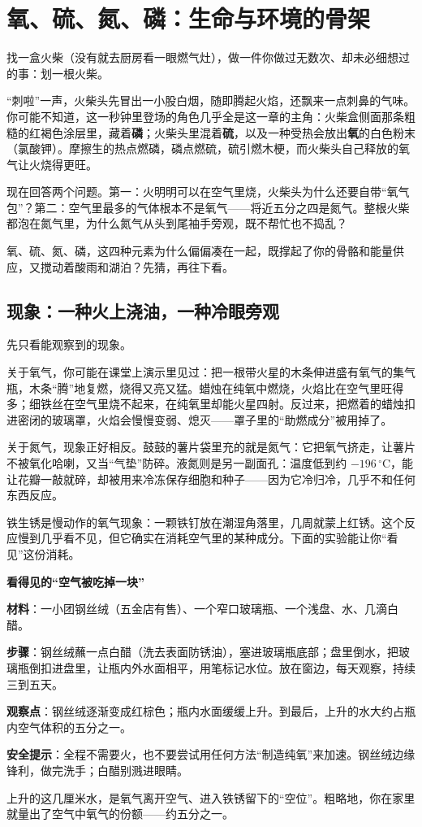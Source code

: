 \chapter{氧、硫、氮、磷：生命与环境的骨架}

\begin{kaichang}
找一盒火柴（没有就去厨房看一眼燃气灶），做一件你做过无数次、却未必细想过的事：划一根火柴。

“刺啦”一声，火柴头先冒出一小股白烟，随即腾起火焰，还飘来一点刺鼻的气味。你可能不知道，这一秒钟里登场的角色几乎全是这一章的主角：火柴盒侧面那条粗糙的红褐色涂层里，藏着\textbf{磷}；火柴头里混着\textbf{硫}，以及一种受热会放出\textbf{氧}的白色粉末（氯酸钾）。摩擦生的热点燃磷，磷点燃硫，硫引燃木梗，而火柴头自己释放的氧气让火烧得更旺。

现在回答两个问题。第一：火明明可以在空气里烧，火柴头为什么还要自带“氧气包”？第二：空气里最多的气体根本不是氧气——将近五分之四是氮气。整根火柴都泡在氮气里，为什么氮气从头到尾袖手旁观，既不帮忙也不捣乱？

氧、硫、氮、磷，这四种元素为什么偏偏凑在一起，既撑起了你的骨骼和能量供应，又搅动着酸雨和湖泊？先猜，再往下看。
\end{kaichang}

\section{现象：一种火上浇油，一种冷眼旁观}

先只看能观察到的现象。

关于氧气，你可能在课堂上演示里见过：把一根带火星的木条伸进盛有氧气的集气瓶，木条“腾”地复燃，烧得又亮又猛。蜡烛在纯氧中燃烧，火焰比在空气里旺得多；细铁丝在空气里烧不起来，在纯氧里却能火星四射。反过来，把燃着的蜡烛扣进密闭的玻璃罩，火焰会慢慢变弱、熄灭——罩子里的“助燃成分”被用掉了。

关于氮气，现象正好相反。鼓鼓的薯片袋里充的就是氮气：它把氧气挤走，让薯片不被氧化哈喇，又当“气垫”防碎。液氮则是另一副面孔：温度低到约 $-196\,^{\circ}\mathrm{C}$，能让花瓣一敲就碎，却被用来冷冻保存细胞和种子——因为它冷归冷，几乎不和任何东西反应。

铁生锈是慢动作的氧气现象：一颗铁钉放在潮湿角落里，几周就蒙上红锈。这个反应慢到几乎看不见，但它确实在消耗空气里的某种成分。下面的实验能让你“看见”这份消耗。

\begin{shiyan}
\textbf{看得见的“空气被吃掉一块”}

\textbf{材料}：一小团钢丝绒（五金店有售）、一个窄口玻璃瓶、一个浅盘、水、几滴白醋。

\textbf{步骤}：钢丝绒蘸一点白醋（洗去表面防锈油），塞进玻璃瓶底部；盘里倒水，把玻璃瓶倒扣进盘里，让瓶内外水面相平，用笔标记水位。放在窗边，每天观察，持续三到五天。

\textbf{观察点}：钢丝绒逐渐变成红棕色；瓶内水面缓缓上升。到最后，上升的水大约占瓶内空气体积的五分之一。

\textbf{安全提示}：全程不需要火，也不要尝试用任何方法“制造纯氧”来加速。钢丝绒边缘锋利，做完洗手；白醋别溅进眼睛。

上升的这几厘米水，是氧气离开空气、进入铁锈留下的“空位”。粗略地，你在家里就量出了空气中氧气的份额——约五分之一。
\end{shiyan}

